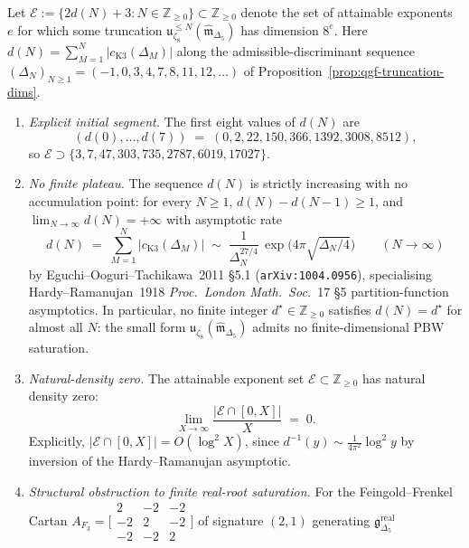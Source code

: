 \begin{theorem}
\label{thm:qgf-pbw-hardy-ramanujan-density}
Let $\mathcal E := \{2d(N)+3 : N\in\mathbb Z_{\ge 0}\}
\subset\mathbb Z_{\ge 0}$ denote the set of attainable exponents
$e$ for which some truncation
$\mathfrak u_{\zeta_8}^{\le N}(\widehat{\mathfrak m}_{\Delta_5})$ has
dimension $8^e$. Here $d(N) = \sum_{M=1}^{N}|c_{\mathrm K3}(\Delta_M)|$
along the admissible-discriminant sequence
$(\Delta_N)_{N\ge 1} = (-1, 0, 3, 4, 7, 8, 11, 12, \dots)$ of
Proposition~\ref{prop:qgf-truncation-dims}.
\begin{enumerate}[label=\textup{(\roman*)}]
 \item \emph{Explicit initial segment.} The first eight values of
 $d(N)$ are
 \[
 (d(0),\dots,d(7))
 \;=\; (0, 2, 22, 150, 366, 1392, 3008, 8512),
 \]
 so $\mathcal E\supset\{3, 7, 47, 303, 735, 2787, 6019, 17027\}$.
 \item \emph{No finite plateau.} The sequence $d(N)$ is strictly
 increasing with no accumulation point: for every
 $N\ge 1$, $d(N) - d(N-1)\ge 1$, and
 $\lim_{N\to\infty}d(N) = +\infty$ with asymptotic rate
 \[
 d(N) \;=\; \sum_{M=1}^N|c_{\mathrm K3}(\Delta_M)|
 \;\sim\; \frac{1}{\Delta_N^{27/4}}\,
 \exp\!\bigl(4\pi\sqrt{\Delta_N/4}\bigr)
 \qquad (N\to\infty)
 \]
 by Eguchi--Ooguri--Tachikawa~2011 \S5.1
 (\texttt{arXiv:1004.0956}), specialising Hardy--Ramanujan~1918
 \emph{Proc.~London Math.~Soc.}~17 \S5 partition-function
 asymptotics. In particular, no finite integer
 $d^\star\in\mathbb Z_{\ge 0}$ satisfies $d(N) = d^\star$ for
 almost all $N$: the small form
 $\mathfrak u_{\zeta_8}(\widehat{\mathfrak m}_{\Delta_5})$
 admits no finite-dimensional PBW saturation.
 \item \emph{Natural-density zero.} The attainable exponent set
 $\mathcal E\subset\mathbb Z_{\ge 0}$ has natural density zero:
 \[
 \lim_{X\to\infty}\frac{|\mathcal E\cap [0,X]|}{X} \;=\; 0.
 \]
 Explicitly, $|\mathcal E\cap[0,X]| = O(\log^2 X)$, since
 $d^{-1}(y)\sim\frac{1}{4\pi^2}\log^2 y$ by inversion of the
 Hardy--Ramanujan asymptotic.
 \item \emph{Structural obstruction to finite real-root saturation.}
 For the Feingold--Frenkel Cartan
 $A_{F_3} = \bigl[\begin{smallmatrix}2&-2&-2\\
 -2&2&-2\\-2&-2&2\end{smallmatrix}\bigr]$ of signature $(2,1)$
 generating $\mathfrak g_{\Delta_5}^{\mathrm{real}}$

\end{enumerate}
\end{theorem}
